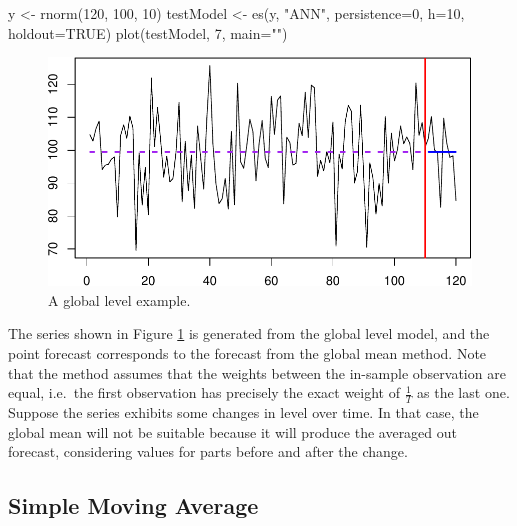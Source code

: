 \documentclass[
]{book}
\newenvironment{Shaded}{\begin{snugshade}}{\end{snugshade}}
\newcommand{\AttributeTok}[1]{\textcolor[rgb]{0.77,0.63,0.00}{#1}}
\newcommand{\ConstantTok}[1]{\textcolor[rgb]{0.00,0.00,0.00}{#1}}
\newcommand{\DecValTok}[1]{\textcolor[rgb]{0.00,0.00,0.81}{#1}}
\newcommand{\FunctionTok}[1]{\textcolor[rgb]{0.00,0.00,0.00}{#1}}
\newcommand{\NormalTok}[1]{#1}
\newcommand{\OtherTok}[1]{\textcolor[rgb]{0.56,0.35,0.01}{#1}}
\newcommand{\StringTok}[1]{\textcolor[rgb]{0.31,0.60,0.02}{#1}}
\theoremstyle{definition}
\theoremstyle{definition}
\theoremstyle{definition}
\theoremstyle{definition}
\theoremstyle{remark}
\begin{document}
\begin{Shaded}
\begin{Highlighting}[]
\NormalTok{y }\OtherTok{\textless{}{-}} \FunctionTok{rnorm}\NormalTok{(}\DecValTok{120}\NormalTok{, }\DecValTok{100}\NormalTok{, }\DecValTok{10}\NormalTok{)}
\NormalTok{testModel }\OtherTok{\textless{}{-}} \FunctionTok{es}\NormalTok{(y, }\StringTok{"ANN"}\NormalTok{, }\AttributeTok{persistence=}\DecValTok{0}\NormalTok{,}
                 \AttributeTok{h=}\DecValTok{10}\NormalTok{, }\AttributeTok{holdout=}\ConstantTok{TRUE}\NormalTok{)}
\FunctionTok{plot}\NormalTok{(testModel, }\DecValTok{7}\NormalTok{, }\AttributeTok{main=}\StringTok{""}\NormalTok{)}
\end{Highlighting}
\end{Shaded}

\begin{figure}
\centering
\includegraphics{Svetunkov--2022----ADAM_files/figure-latex/globalMeanExample-1.pdf}
\caption{\label{fig:globalMeanExample}A global level example.}
\end{figure}

The series shown in Figure \ref{fig:globalMeanExample} is generated from the global level model, and the point forecast corresponds to the forecast from the global mean method. Note that the method assumes that the weights between the in-sample observation are equal, i.e.~the first observation has precisely the exact weight of \(\frac{1}{T}\) as the last one. Suppose the series exhibits some changes in level over time. In that case, the global mean will not be suitable because it will produce the averaged out forecast, considering values for parts before and after the change.

\hypertarget{SMA}{%
\subsection{Simple Moving Average}\label{SMA}}
\end{document}
